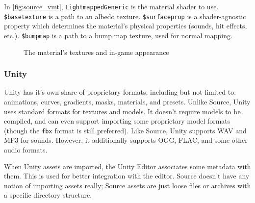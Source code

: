 \documentclass[a4paper, 12pt]{scrartcl}
\begin{document}
In \cref{fig:source_vmt}, \texttt{LightmappedGeneric} is the material shader to use. \texttt{\$basetexture} is a path to an albedo texture. \texttt{\$surfaceprop} is a shader-agnostic property which determines the material's physical properties (sounds, hit effects, etc.). \texttt{\$bumpmap} is a path to a bump map texture, used for normal mapping.

\begin{figure}[!ht]
  \centering
  \qquad
  \caption{The material's textures and in-game appearance}
  \label{fig:source_texture}
\end{figure}

\subsubsection{Unity}
Unity has it's own share of proprietary formats, including but not limited to: animations, curves, gradients, masks, materials, and presets. Unlike Source, Unity uses standard formats for textures and models. It doesn't require models to be compiled, and can even support importing some proprietary model formats (though the \texttt{fbx} format is still preferred). Like Source, Unity supports WAV and MP3 for sounds. However, it additionally supports OGG, FLAC, and some other audio formats.

When Unity assets are imported, the Unity Editor associates some metadata with them. This is used for better integration with the editor. Source doesn't have any notion of importing assets really; Source assets are just loose files or archives with a specific directory structure.
\end{document}
